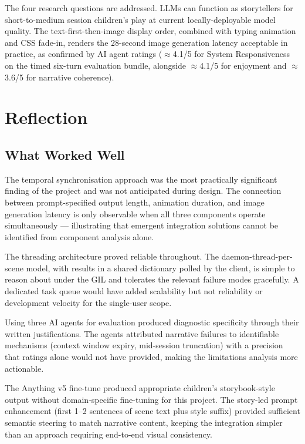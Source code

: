 \documentclass[12pt,a4paper]{article}
\begin{document}
The four research questions are addressed. LLMs can function as storytellers for short-to-medium session children's play at current locally-deployable model quality. The text-first-then-image display order, combined with typing animation and CSS fade-in, renders the 28-second image generation latency acceptable in practice, as confirmed by AI agent ratings ($\approx$4.1/5 for System Responsiveness on the timed six-turn evaluation bundle, alongside $\approx$4.1/5 for enjoyment and $\approx$3.6/5 for narrative coherence).

\section{Reflection}

\subsection{What Worked Well}

The temporal synchronisation approach was the most practically significant finding of the project and was not anticipated during design. The connection between prompt-specified output length, animation duration, and image generation latency is only observable when all three components operate simultaneously --- illustrating that emergent integration solutions cannot be identified from component analysis alone.

The threading architecture proved reliable throughout. The daemon-thread-per-scene model, with results in a shared dictionary polled by the client, is simple to reason about under the GIL and tolerates the relevant failure modes gracefully. A dedicated task queue would have added scalability but not reliability or development velocity for the single-user scope.

Using three AI agents for evaluation produced diagnostic specificity through their written justifications. The agents attributed narrative failures to identifiable mechanisms (context window expiry, mid-session truncation) with a precision that ratings alone would not have provided, making the limitations analysis more actionable.

The Anything v5 fine-tune produced appropriate children's storybook-style output without domain-specific fine-tuning for this project. The story-led prompt enhancement (first 1--2 sentences of scene text plus style suffix) provided sufficient semantic steering to match narrative content, keeping the integration simpler than an approach requiring end-to-end visual consistency.
\end{document}
